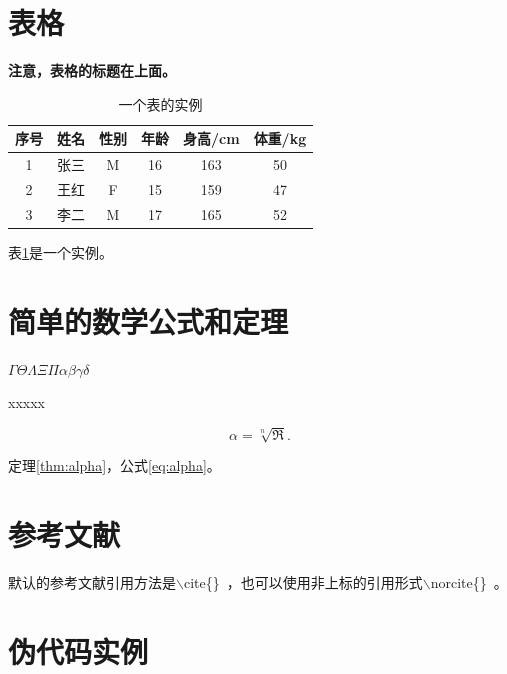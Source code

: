 \section{表格}

\par \textbf{注意，表格的标题在上面。}

\begin{table}[!ht]
\centering
\caption{一个表的实例}
\label{tab:tabobj}
    \begin{tabular}{cccccc}
        \toprule
        序号 & 姓名 & 性别 & 年龄 & 身高/cm & 体重/kg \\
        \midrule
        1 & 张三 & M & 16 & 163 & 50 \\
        2 & 王红 & F & 15 & 159 & 47 \\
        3 & 李二 & M & 17 & 165 & 52 \\
        \bottomrule
    \end{tabular}
\end{table}

\par 表\ref{tab:tabobj}是一个实例。

\section{简单的数学公式和定理}

\begin{sthm}
    $\Gamma\Theta\Lambda\Xi\Pi\alpha\beta\gamma\delta$
\end{sthm}

\begin{thm}
\label{thm:alpha}
    xxxxx
\end{thm}

\begin{equation}
\label{eq:alpha}
    \alpha=\sqrt[n]{\Re}.
\end{equation}
\par 定理\ref{thm:alpha}，公式\ref{eq:alpha}。

\section{参考文献}

默认的参考文献引用方法是$\backslash$cite\{\}~\cite{broder1997resemblance,broder1997syntactic}，也可以使用非上标的引用形式$\backslash$norcite\{\}~。


\section{伪代码实例}

